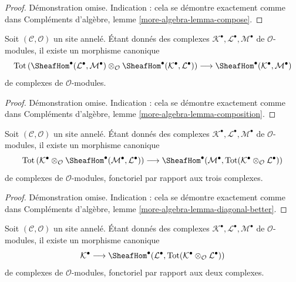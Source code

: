 \begin{proof}
Démonstration omise. Indication : cela se démontre exactement comme dans
Compléments d'algèbre, lemme \ref{more-algebra-lemma-compose}.
\end{proof}

\begin{lemma}
\label{lemma-composition}
Soit $(\mathcal{C}, \mathcal{O})$ un site annelé. Étant donnés des complexes
$\mathcal{K}^\bullet, \mathcal{L}^\bullet, \mathcal{M}^\bullet$
de $\mathcal{O}$-modules, il existe un morphisme canonique
$$
\text{Tot}\left(
\SheafHom^\bullet(\mathcal{L}^\bullet, \mathcal{M}^\bullet)
\otimes_\mathcal{O}
\SheafHom^\bullet(\mathcal{K}^\bullet, \mathcal{L}^\bullet)
\right)
\longrightarrow
\SheafHom^\bullet(\mathcal{K}^\bullet, \mathcal{M}^\bullet)
$$
de complexes de $\mathcal{O}$-modules.
\end{lemma}

\begin{proof}
Démonstration omise. Indication : cela se démontre exactement comme dans
Compléments d'algèbre, lemme \ref{more-algebra-lemma-composition}.
\end{proof}

\begin{lemma}
\label{lemma-diagonal-better}
Soit $(\mathcal{C}, \mathcal{O})$ un site annelé. Étant donnés des complexes
$\mathcal{K}^\bullet, \mathcal{L}^\bullet, \mathcal{M}^\bullet$
de $\mathcal{O}$-modules, il existe un morphisme canonique
$$
\text{Tot}\left(
\mathcal{K}^\bullet \otimes_\mathcal{O}
\SheafHom^\bullet(\mathcal{M}^\bullet, \mathcal{L}^\bullet)
\right)
\longrightarrow
\SheafHom^\bullet(\mathcal{M}^\bullet,
\text{Tot}(\mathcal{K}^\bullet \otimes_\mathcal{O} \mathcal{L}^\bullet))
$$
de complexes de $\mathcal{O}$-modules, fonctoriel par rapport aux trois complexes.
\end{lemma}

\begin{proof}
Démonstration omise. Indication : cela se démontre exactement comme dans
Compléments d'algèbre, lemme \ref{more-algebra-lemma-diagonal-better}.
\end{proof}

\begin{lemma}
\label{lemma-diagonal}
Soit $(\mathcal{C}, \mathcal{O})$ un site annelé. Étant donnés des complexes
$\mathcal{K}^\bullet, \mathcal{L}^\bullet, \mathcal{M}^\bullet$
de $\mathcal{O}$-modules, il existe un morphisme canonique
$$
\mathcal{K}^\bullet
\longrightarrow
\SheafHom^\bullet(\mathcal{L}^\bullet,
\text{Tot}(\mathcal{K}^\bullet \otimes_\mathcal{O} \mathcal{L}^\bullet))
$$
de complexes de $\mathcal{O}$-modules, fonctoriel par rapport aux deux complexes.
\end{lemma}

